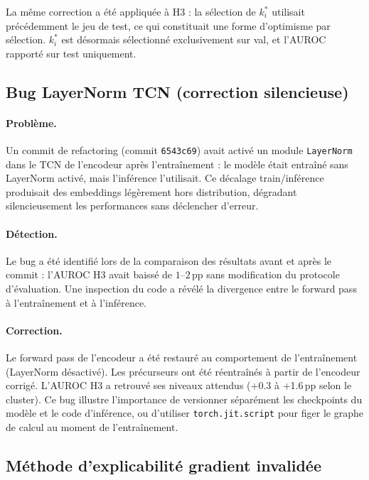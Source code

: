 La même correction a été appliquée à H3 : la sélection de $k^*_i$ utilisait
précédemment le jeu de test, ce qui constituait une forme d'optimisme par sélection.
$k^*_i$ est désormais sélectionné exclusivement sur val, et l'AUROC rapporté
sur test uniquement.

\subsection{Bug LayerNorm TCN (correction silencieuse)}
\label{sec:diff_layernorm}

\paragraph{Problème.}
Un commit de refactoring (commit \texttt{6543c69}) avait activé un module
\texttt{LayerNorm} dans le TCN de l'encodeur après l'entraînement : le modèle était
entraîné sans LayerNorm activé, mais l'inférence l'utilisait.
Ce décalage train/inférence produisait des embeddings légèrement hors distribution,
dégradant silencieusement les performances sans déclencher d'erreur.

\paragraph{Détection.}
Le bug a été identifié lors de la comparaison des résultats avant et après le commit :
l'AUROC H3 avait baissé de $1$--$2$\,pp sans modification du protocole d'évaluation.
Une inspection du code a révélé la divergence entre le forward pass à l'entraînement
et à l'inférence.

\paragraph{Correction.}
Le forward pass de l'encodeur a été restauré au comportement de l'entraînement
(LayerNorm désactivé). Les précurseurs ont été réentraînés à partir de l'encodeur corrigé.
L'AUROC H3 a retrouvé ses niveaux attendus (+0.3 à +1.6\,pp selon le cluster).
Ce bug illustre l'importance de versionner séparément les checkpoints du modèle
et le code d'inférence, ou d'utiliser \texttt{torch.jit.script} pour figer le graphe
de calcul au moment de l'entraînement.

\subsection{Méthode d'explicabilité gradient invalidée}
\label{sec:diff_saliency}

